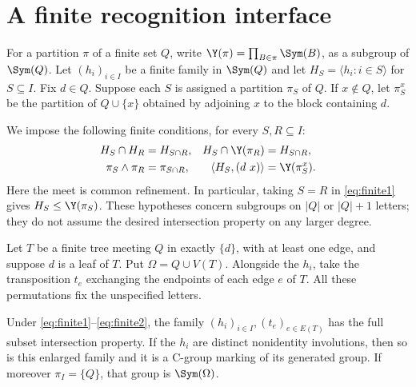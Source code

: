 \section{A finite recognition interface}
For a partition $\pi$ of a finite set $Q$, write
$\Y(\pi)=\prod_{B\in\pi}\Sym(B)$, as a subgroup of $\Sym(Q)$.
Let $(h_i)_{i\in I}$ be a finite family in $\Sym(Q)$ and let
$H_S=\langle h_i:i\in S\rangle$ for $S\subseteq I$.
Fix $d\in Q$. Suppose each $S$ is assigned a partition $\pi_S$ of $Q$.
If $x\notin Q$, let $\pi_S^x$ be the partition of $Q\cup\{x\}$
obtained by adjoining $x$ to the block containing $d$.

We impose the following finite conditions, for every $S,R\subseteq I$:
\begin{align}
H_S\cap H_R&=H_{S\cap R}, &
H_S\cap\Y(\pi_R)&=H_{S\cap R},\label{eq:finite1}\\
\pi_S\wedge\pi_R&=\pi_{S\cap R}, &
\langle H_S,(d\ x)\rangle&=\Y(\pi_S^x).
\label{eq:finite2}
\end{align}
Here the meet is common refinement. In particular, taking $S=R$ in
\eqref{eq:finite1} gives $H_S\leq\Y(\pi_S)$. These hypotheses concern
subgroups on $|Q|$ or $|Q|+1$ letters; they do not assume the desired
intersection property on any larger degree.

Let $T$ be a finite tree meeting $Q$ in exactly $\{d\}$, with at least
one edge, and suppose $d$ is a leaf of $T$. Put
$\Omega=Q\cup V(T)$. Alongside the $h_i$, take the transposition
$t_e$ exchanging the endpoints of each edge $e$ of $T$. All these
permutations fix the unspecified letters.

\begin{theorem}\label{thm:attachment}
Under \eqref{eq:finite1}--\eqref{eq:finite2}, the family
$(h_i)_{i\in I},(t_e)_{e\in E(T)}$ has the full subset intersection
property. If the $h_i$ are distinct nonidentity involutions, then so is
this enlarged family and it is a C-group marking of its generated group.
If moreover $\pi_I=\{Q\}$, that group is $\Sym(\Omega)$.
\end{theorem}

